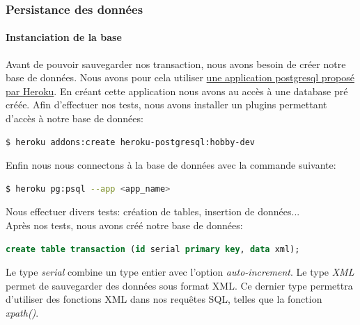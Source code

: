\documentclass{article}
\begin{document}
      \subsubsection{Persistance des données}
	\paragraph{Instanciation de la base}
	  Avant de pouvoir sauvegarder nos transaction, nous avons besoin de créer notre base de données.
	  Nous avons pour cela utiliser \href{https://elements.heroku.com/addons/heroku-postgresql}{une application postgresql proposé par Heroku}.
	  En créant cette application nous avons au accès à une database pré créée.
	  Afin d'effectuer nos tests, nous avons installer un plugins permettant d'accès à notre base de données:
	  \begin{lstlisting}[language=bash]
    $ heroku addons:create heroku-postgresql:hobby-dev
	  \end{lstlisting}
	  Enfin nous nous connectons à la base de données avec la commande suivante:
	  \begin{lstlisting}[language=bash]
    $ heroku pg:psql --app <app_name>
	  \end{lstlisting}
	  Nous effectuer divers tests: création de tables, insertion de données...\\
	  Après nos tests, nous avons créé notre base de données:
	  \begin{lstlisting}[language=sql]
    create table transaction (id serial primary key, data xml);
	  \end{lstlisting}
	  Le type \emph{serial} combine un type entier avec l'option \emph{auto-increment}. Le type \emph{XML} permet de sauvegarder des données sous format XML. Ce dernier type permettra 
	  d'utiliser des fonctions XML dans nos requêtes SQL, telles que la fonction \emph{xpath()}.
\end{document}
